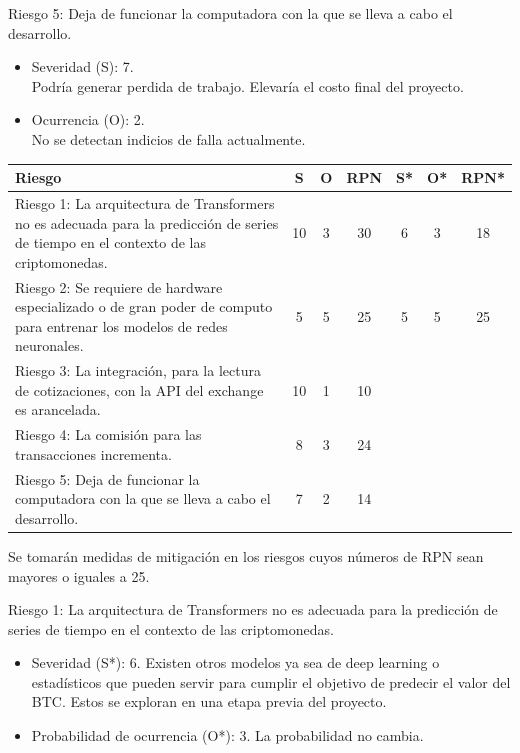 \documentclass[
    11pt, %
]{charter}
\begin{document}
        Riesgo 5: Deja de funcionar la computadora con la que se lleva a cabo el desarrollo.
        \begin{itemize}
        \item Severidad (S): 7.\\
          Podría generar perdida de trabajo. Elevaría el costo final del proyecto.
        \item Ocurrencia (O): 2.\\
          No se detectan indicios de falla actualmente.
        \end{itemize}
     \begin{table}[htpb]
            \centering
            \begin{tabularx}{\linewidth}{@{}|X|c|c|c|c|c|c|@{}}
                \hline
                \rowcolor[HTML]{C0C0C0}
                Riesgo & S & O & RPN & S* & O* & RPN* \\ \hline
                Riesgo 1: La arquitectura de Transformers no es adecuada para la predicción de series de tiempo en el contexto de las criptomonedas. & 10  & 3  & 30     &  6  & 3   &    18  \\ \hline
                Riesgo 2: Se requiere de hardware especializado o de gran poder de computo para entrenar los modelos de redes neuronales. & 5  & 5  &  25   &  5  & 5   & 25     \\ \hline
                Riesgo 3: La integración, para la lectura de cotizaciones, con la API del exchange es arancelada.  & 10  & 1  &  10   &    &    &      \\ \hline
                Riesgo 4: La comisión para las transacciones incrementa. & 8  & 3  &  24   &    &    &      \\ \hline
                Riesgo 5: Deja de funcionar la computadora con la que se lleva a cabo el desarrollo. & 7  & 2  &  14   &    &    &      \\ \hline
            \end{tabularx}%
        \end{table}

     Se tomarán medidas de mitigación en los riesgos cuyos números de RPN sean mayores o iguales a 25.


        Riesgo 1: La arquitectura de Transformers no es adecuada para la predicción de series de tiempo en el contexto de las criptomonedas.
        \begin{itemize}
        \item Severidad (S*): 6.
          Existen otros modelos ya sea de deep learning o estadísticos que pueden servir para cumplir el objetivo de predecir el valor del BTC. Estos se exploran en una etapa previa del proyecto.
        \item Probabilidad de ocurrencia (O*): 3.
          La probabilidad no cambia.
        \end{itemize}
\end{document}
